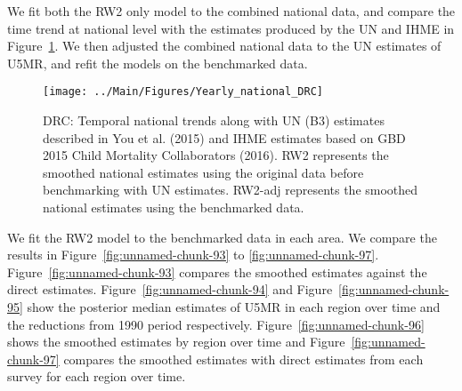 \documentclass[12pt]{article}\usepackage[]{graphicx}\usepackage[]{color}
\newenvironment{knitrout}{}{} %
\begin{document}
We fit both the RW2 only model to the combined national data, and compare the time trend at national level with the estimates produced by the UN and IHME in Figure~\ref{fig:unnamed-chunk-92}. We then adjusted the combined national data to the UN estimates of U5MR, and refit the models on the benchmarked data. 

\begin{knitrout}
\color{fgcolor}\begin{figure}[bht]

{\centering \texttt{[image: ../Main/Figures/Yearly\_national\_DRC]} 

}

\caption[DRC]{DRC: Temporal national trends along with UN (B3) estimates described in You et al. (2015) and IHME estimates based on GBD 2015 Child Mortality Collaborators (2016). RW2 represents the smoothed national estimates using the original data before benchmarking with UN estimates. RW2-adj represents the smoothed national estimates using the benchmarked data.}\label{fig:unnamed-chunk-92}
\end{figure}


\end{knitrout}
 

We fit the RW2 model to the benchmarked data in each area. 
We compare the results in Figure~\ref{fig:unnamed-chunk-93} to \ref{fig:unnamed-chunk-97}.
Figure~\ref{fig:unnamed-chunk-93} compares the smoothed estimates against the direct estimates. Figure~\ref{fig:unnamed-chunk-94} and Figure~\ref{fig:unnamed-chunk-95} show the posterior median estimates of U5MR in each region over time and the reductions from 1990 period respectively.
Figure~\ref{fig:unnamed-chunk-96} shows the smoothed estimates by region over time and Figure~\ref{fig:unnamed-chunk-97} compares the smoothed estimates with direct estimates from each survey for each region over time.




\end{document}
